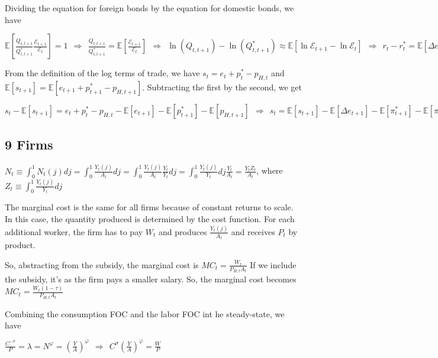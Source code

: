 \documentclass[
]{article}
\begin{document}
Dividing the equation for foreign bonds by the equation for domestic
bonds, we have

\(\displaystyle \mathbb{E} \left[ \frac{Q_{t,t+1}}{Q_{t,t+1}^*} \frac{\mathcal{E}_{t+1}}{\mathcal{E}_{t}} \right]=1 \ \ \Rightarrow \ \ \frac{Q_{t,t+1}}{Q_{t,t+1}^*} = \mathbb{E} \left[ \frac{\mathcal{E}_{t+1}}{\mathcal{E}_{t}} \right] \ \ \Rightarrow \ \ \ln(Q_{t,t+1})-\ln(Q_{t,t+1}^*) \approx \mathbb{E}[\ln{\mathcal{E}_{t+1} }-\ln \mathcal{E}_{t}] \ \ \Rightarrow \ \ r_t-r_t^*=\mathbb{E}[\Delta e_{t+1}]\)

From the definition of the log terms of trade, we have
\(s_t = e_t + p_t^* - p_{H,t}\) and
\(\mathbb{E}[s_{t+1}] = \mathbb{E}[e_{t+1} + p_{t+1}^* - p_{H,t+1}]\).
Subtracting the first by the second, we get

\(s_t - \mathbb{E}[s_{t+1}] = e_t + p_t^* - p_{H,t} - \mathbb{E}[e_{t+1}] - \mathbb{E}[p_{t+1}^*] - \mathbb{E}[p_{H,t+1}] \ \ \Rightarrow \ \ s_t = \mathbb{E}[s_{t+1}]-\mathbb{E}[\Delta e_{t+1}] -\mathbb{E}[\pi_{t+1}^*]-\mathbb{E}[\pi_{H,t+1}]=r_t^*-\mathbb{E}[\pi_{t+1}^*] - (r_t-\mathbb{E}[\pi_{H,t+1}])+\mathbb{E}[s_{t+1}]\)

\hypertarget{firms}{%
\subsection{9 Firms}\label{firms}}

\(\displaystyle N_t \equiv \int_0^1 N_t(j)dj = \int_0^1\frac{Y_t(j)}{A_t}dj=\int_0^1\frac{Y_t(j)}{A_t}\frac{Y_t}{Y_t}dj=\int_0^1\frac{Y_t(j)}{Y_t}dj\frac{Y_t}{A_t}=\frac{Y_t Z_t}{A_t}\),
where \(\displaystyle Z_t \equiv \int_0^1\frac{Y_t(j)}{Y_t}dj\)

The marginal cost is the same for all firms because of constant returns
to scale. In this case, the quantity produced is determined by the cost
function. For each additional worker, the firm has to pay \(W_t\) and
produces \(\displaystyle \frac{Y_t(j)}{A_t}\) and receives \(P_t\) by
product.

So, abstracting from the subsidy, the marginal cost is
\(\displaystyle MC_t = \frac{W_t}{P_{H,t} A_t}\) If we include the
subsidy, it's as the firm pays a smaller salary. So, the marginal cost
becomes \(\displaystyle MC_t = \frac{W_t(1-\tau)}{P_{H,t} A_t}\)

Combining the consumption FOC and the labor FOC int he steady-state, we
have

\(\displaystyle \frac{C^{-\sigma}}{P} = \lambda = N^{\varphi}=\left( \frac{Y}{A} \right)^\varphi\ \ \Rightarrow \ \ C^\sigma \left( \frac{Y}{A} \right)^\varphi=\frac{W}{P}\)
\end{document}
